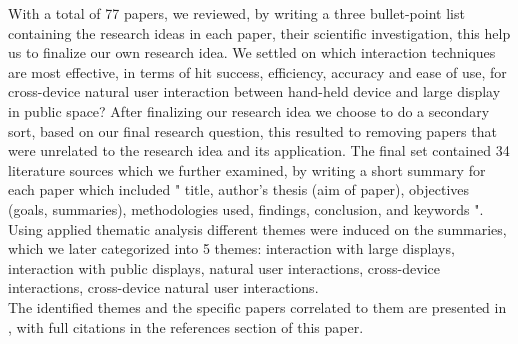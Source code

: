 With a total of 77 papers, we reviewed, by writing a three bullet-point list containing the research ideas in each paper, their scientific investigation, this help us to finalize our own  research idea. We settled on which interaction techniques are most effective, in terms of hit success, efficiency, accuracy and ease of use, for cross-device natural user interaction between hand-held device and large display in public space? After finalizing our research idea we choose to do a secondary sort, based on our final research question, this resulted to removing papers that were unrelated to the research idea and its application.
The final set contained 34 literature sources which we further examined, by writing a short summary for each paper which included " title, author's thesis (aim of paper), objectives (goals, summaries), methodologies used, findings, conclusion, and keywords ". 
Using applied thematic analysis different themes were induced on the summaries, which we later categorized into 5 themes: interaction with large displays, interaction with public displays, natural user interactions, cross-device interactions, cross-device natural user interactions.\\

The identified themes and the specific papers correlated to them are presented in , with full citations in the references section of this paper. 

